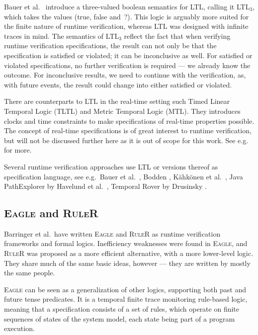 Bauer et al.\ \cite{bauer06monitoring} introduce a three-valued boolean
semantics for LTL, calling it LTL$_3$, which takes the values (true, false
and~?). This logic is arguably more suited for the finite nature of runtime
verification, whereas LTL was designed with infinite traces in mind. The
semantics of LTL$_3$ reflect the fact that when verifying runtime verification
specifications, the result can not only be that the specification is satisfied
or violated; it can be inconclusive as well. For satisfied or violated
specifications, no further verification is required --- we already know the
outcome. For inconclusive results, we need to continue with the verification,
as, with future events, the result could change into either satisfied or
violated.

There are counterparts to LTL in the real-time setting such Timed Linear
Temporal Logic (TLTL) and Metric Temporal Logic (MTL). They introduces clocks
and time constraints to make specifications of real-time properties possible.
The concept of real-time specifications is of great interest to runtime
verification, but will not be discussed further here as it is out of scope for
this work. See e.g.\ \cite{bauer06monitoring,drusinsky00temporalrover} for
more.

Several runtime verification approaches use LTL or versions thereof as
specification language, see e.g.\ Bauer et al.\
\cite{bauer06monitoring}, Bodden \cite{bodden05efficientrv}, Kähkönen et al.\
\cite{kahkonen09lime}, Java PathExplorer by Havelund et al.\
\cite{havelund04jpax}, Temporal Rover by Drusinsky
\cite{drusinsky00temporalrover}.

\subsection{\textsc{Eagle} and \textsc{RuleR}}

Barringer et al.\ have written \textsc{Eagle} \cite{barringer03eagle} and
\textsc{RuleR} \cite{barringer07ruler} as runtime verification frameworks and
formal logics.  Inefficiency weaknesses were found in \textsc{Eagle}, and
\textsc{RuleR} was proposed as a more efficient alternative, with a more
lower-level logic. They share much of the same basic ideas, however --- they
are written by mostly the same people.

\textsc{Eagle} can be seen as a generalization of other logics, supporting both
past and future tense predicates. It is a temporal finite trace monitoring
rule-based logic, meaning that a specification consists of a set of rules,
which operate on finite sequences of states of the system model, each state
being part of a program execution.


